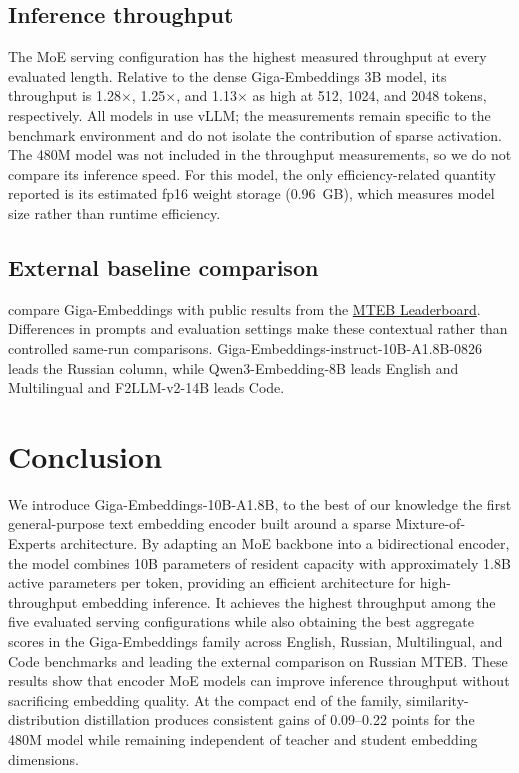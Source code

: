 \documentclass[11pt]{article}
\begin{document}
\subsection{Inference throughput}

The MoE serving configuration has the highest measured throughput at every evaluated length.
Relative to the dense Giga-Embeddings 3B model, its throughput is 1.28$\times$, 1.25$\times$, and 1.13$\times$ as high at 512, 1024, and 2048 tokens, respectively.
All models in  use vLLM; the measurements remain specific to the benchmark environment and do not isolate the contribution of sparse activation.
The 480M model was not included in the throughput measurements, so we do not compare its inference speed.
For this model, the only efficiency-related quantity reported is its estimated fp16 weight storage (0.96~GB), which measures model size rather than runtime efficiency.

\subsection{External baseline comparison}

 compare Giga-Embeddings with public results from the \href{https://huggingface.co/spaces/mteb/leaderboard}{MTEB Leaderboard}.
Differences in prompts and evaluation settings make these contextual rather than controlled same-run comparisons.
Giga-Embeddings-instruct-10B-A1.8B-0826 leads the Russian column, while Qwen3-Embedding-8B leads English and Multilingual and F2LLM-v2-14B leads Code.

\section{Conclusion}

We introduce Giga-Embeddings-10B-A1.8B, to the best of our knowledge the first general-purpose text embedding encoder built around a sparse Mixture-of-Experts architecture.
By adapting an MoE backbone into a bidirectional encoder, the model combines 10B parameters of resident capacity with approximately 1.8B active parameters per token, providing an efficient architecture for high-throughput embedding inference.
It achieves the highest throughput among the five evaluated serving configurations while also obtaining the best aggregate scores in the Giga-Embeddings family across English, Russian, Multilingual, and Code benchmarks and leading the external comparison on Russian MTEB.
These results show that encoder MoE models can improve inference throughput without sacrificing embedding quality.
At the compact end of the family, similarity-distribution distillation produces consistent gains of 0.09--0.22 points for the 480M model while remaining independent of teacher and student embedding dimensions.
\end{document}
